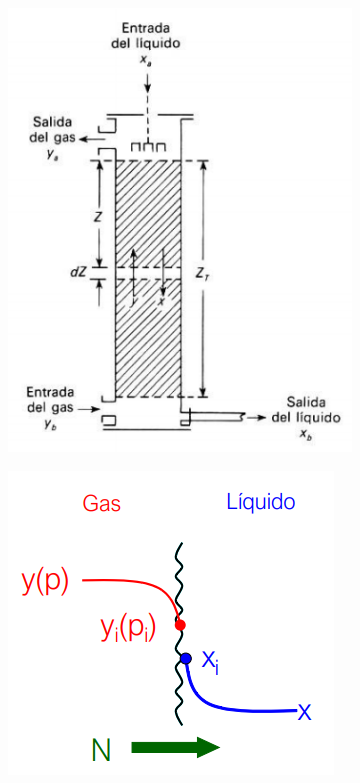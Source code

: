 \documentclass[11pt]{book}
\begin{document}
\begin{figure}[H]
  \begin{subfigure}[b]{0.45\textwidth}
    \includegraphics[width=\textwidth]{img/absorcion/Absorcion_6a.PNG}
    \caption{ }
    \label{fig:Absorcion_6a}
  \end{subfigure}
  \hfill
  \begin{subfigure}[b]{0.45\textwidth}
    \includegraphics[width=\textwidth]{img/absorcion/Absorcion_6b.PNG}

\end{subfigure}
\end{figure}
\end{document}
